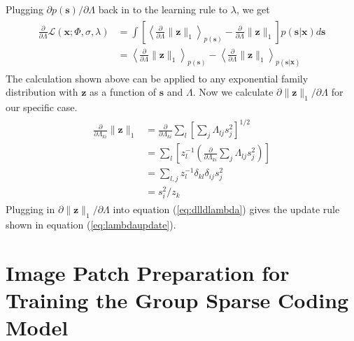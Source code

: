 Plugging $\partial p(\boldsymbol{s}) / \partial\Lambda$ back in to the learning rule to $\lambda$, we get
\begin{align}
\begin{split}
\label{eq:dlldlambda}
\frac{\partial}{\partial\Lambda} \mathcal{L}(\boldsymbol{x}; \Phi, \sigma, \lambda)
	&=	\int \left[ \left<
	    \frac{\partial}{\partial\Lambda}\|\boldsymbol{z}\|_1
	    \right>_{p(\boldsymbol{s})} -
	    \frac{\partial}{\partial\Lambda}\|\boldsymbol{z}\|_1
	    \right] p(\boldsymbol{s}|\boldsymbol{x}) d\boldsymbol{s} \\
	&=  \left<
	    \frac{\partial}{\partial\Lambda}\|\boldsymbol{z}\|_1
	    \right>_{p(\boldsymbol{s})} -
	    \left<
	    \frac{\partial}{\partial\Lambda}\|\boldsymbol{z}\|_1
	    \right>_{p(\boldsymbol{s}|\boldsymbol{x})}
\end{split}
\end{align}
The calculation shown above can be applied to any exponential family distribution with $\boldsymbol{z}$ as a function of $\boldsymbol{s}$ and $\Lambda$. Now we calculate $\partial \|\boldsymbol{z}\|_1 / \partial\Lambda$ for our specific case.
\begin{align}
\begin{split}
\label{eq:dzdlambda}
\frac{\partial}{\partial\Lambda_{ki}} \|\boldsymbol{z}\|_1
	&= \frac{\partial}{\partial\Lambda_{ki}}
	   \sum_l \left[ \sum_j \Lambda_{lj} s_j^2 \right]^{1/2} \\
	&= \sum_l \left[ z_l^{-1} \left(
	   \frac{\partial}{\partial\Lambda_{ki}} \sum_j \Lambda_{lj} s_j^2
	   \right) \right] \\
	&= \sum_{l, j} z_l^{-1} \delta_{kl} \delta_{ij} s_j^2 \\
	&= s_i^2 / z_k
\end{split}
\end{align}
Plugging in $\partial \|\boldsymbol{z}\|_1 / \partial\Lambda$ into equation (\ref{eq:dlldlambda}) gives the update rule shown in equation (\ref{eq:lambdaupdate}).

\section{Image Patch Preparation for Training the Group Sparse Coding Model}
\label{app:patch}

